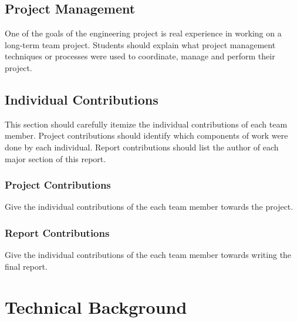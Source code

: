 \documentclass[12pt]{report}
\begin{document}

\section{Project Management}

One of the goals of the engineering project is real experience in working on a long-term team project.  Students should explain what project management techniques or processes were used to coordinate, manage and perform their project.


\section{Individual Contributions}

This section should carefully itemize the individual contributions of each team member. Project contributions should identify which components of work were done by each individual.  Report contributions should list the author of each major section of this report.


\subsection{Project Contributions}

Give the individual contributions of the each team member towards the project.


\subsection{Report Contributions}

Give the individual contributions of the each team member towards writing the
final report.


\chapter{Technical Background}
\end{document}
